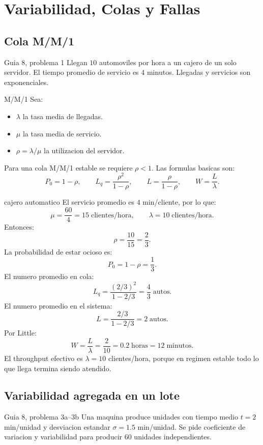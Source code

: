 \section{Variabilidad, Colas y Fallas}

\subsection{Cola M/M/1}

\begin{ejercicio}{Guia 8, problema 1}
Llegan $10$ automoviles por hora a un cajero de un solo servidor. El tiempo promedio de servicio es $4$ minutos. Llegadas y servicios son exponenciales.
\end{ejercicio}

\begin{materia}{M/M/1}
Sea:
\begin{itemize}
  \item $\lambda$ la tasa media de llegadas.
  \item $\mu$ la tasa media de servicio.
  \item $\rho=\lambda/\mu$ la utilizacion del servidor.
\end{itemize}
Para una cola M/M/1 estable se requiere $\rho<1$. Las formulas basicas son:
\[
  P_0=1-\rho,\qquad
  L_q=\frac{\rho^2}{1-\rho},\qquad
  L=\frac{\rho}{1-\rho},\qquad
  W=\frac{L}{\lambda}.
\]
\end{materia}

\begin{solucion}{cajero automatico}
El servicio promedio es $4$ min/cliente, por lo que:
\[
  \mu=\frac{60}{4}=15\;\text{clientes/hora},\qquad
  \lambda=10\;\text{clientes/hora}.
\]
Entonces:
\[
  \rho=\frac{10}{15}=\frac23.
\]
La probabilidad de estar ocioso es:
\[
  P_0=1-\rho=\frac13.
\]
El numero promedio en cola:
\[
  L_q=\frac{(2/3)^2}{1-2/3}=\frac43\;\text{autos}.
\]
El numero promedio en el sistema:
\[
  L=\frac{2/3}{1-2/3}=2\;\text{autos}.
\]
Por Little:
\[
  W=\frac{L}{\lambda}=\frac{2}{10}=0.2\;\text{horas}=12\;\text{minutos}.
\]
El throughput efectivo es $\lambda=10$ clientes/hora, porque en regimen estable todo lo que llega termina siendo atendido.
\end{solucion}

\subsection{Variabilidad agregada en un lote}

\begin{ejercicio}{Guia 8, problema 3a--3b}
Una maquina produce unidades con tiempo medio $t=2$ min/unidad y desviacion estandar $\sigma=1.5$ min/unidad. Se pide coeficiente de variacion y variabilidad para producir $60$ unidades independientes.
\end{ejercicio}

